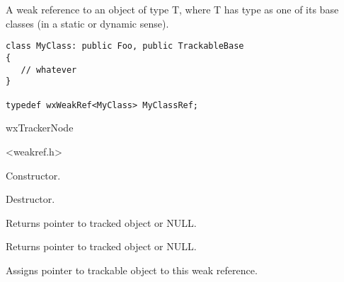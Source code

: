 \section{}\label{wxweakref}

A weak reference to an object of type T, where T has type 
 as one of its
base classes  (in a static or dynamic sense).

\begin{verbatim}
class MyClass: public Foo, public TrackableBase
{
   // whatever
}

typedef wxWeakRef<MyClass> MyClassRef;
\end{verbatim}


wxTrackerNode


<weakref.h>




\label{wxweakrefwxweakref}


Constructor.

\label{wxweakrefdtor}


Destructor.

\label{wxweakreft}


Returns pointer to tracked object or NULL.

\label{wxweakrefoperatorderef}


Returns pointer to tracked object or NULL.

\label{wxweakrefoperatorassign}


Assigns pointer to trackable object to this weak reference.

\label{wxweakrefassign}


